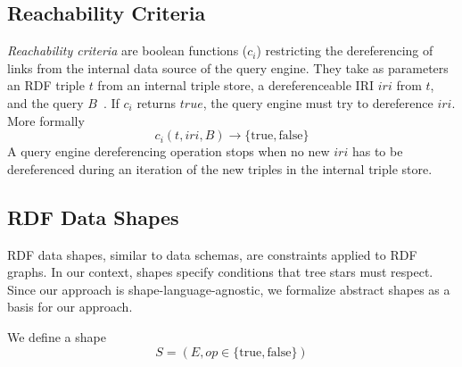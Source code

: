\subsection{Reachability Criteria}

\emph{Reachability criteria} are boolean functions ($c_i$) restricting the dereferencing of links from the internal data source of the query engine.
They take as parameters an RDF triple $t$ from an internal triple store, a dereferenceable IRI $iri$ from $t$, and the query $B$~\cite{Hartig2012}.
If $c_i$ returns $true$, the query engine must try to dereference $iri$.
More formally
\begin{equation}\label{eq:reachabilityCriteria}
c_i(t, iri, B) \rightarrow \{\mathrm{true}, \mathrm{false}\}
\end{equation}
A query engine dereferencing operation stops when no new $iri$ has to be dereferenced during an iteration of the new triples in the internal triple store.

\subsection{RDF Data Shapes}\label{sec:shape}
RDF data shapes, similar to data schemas, are constraints applied to RDF graphs.
In our context, shapes specify conditions that tree stars  must respect. 
Since our approach is shape-language-agnostic, we formalize abstract shapes as a basis for our approach.


We define a shape
\begin{equation}
S = (E, op \in \{\mathrm{true},\mathrm{false}\})
\end{equation}

